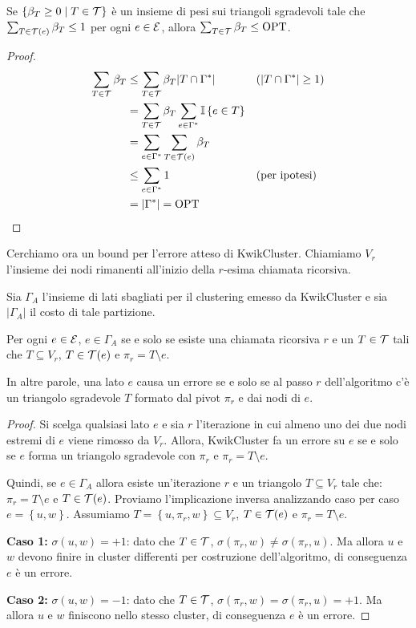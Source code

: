 \begin{lemma}
    \label{lemma:corr_clust_1}
    Se $\left\{\beta_T \geq 0 \mid T \in \mathcal{T} \right\}$ è un insieme di pesi sui triangoli sgradevoli tale che $\sum_{T \in \mathcal{T}(e)} \beta_T \leq 1$ per ogni $e \in \mathcal{E}$, allora $\sum_{T \in \mathcal{T}} \beta_T \leq \textnormal{OPT}$.
\end{lemma}
\begin{proof}
    \begin{align*}
    	\sum_{T \in \mathcal{T}} \beta_T & \leq \sum_{T \in \mathcal{T}} \beta_T |T \cap \Gamma^\ast| && (|T \cap \Gamma^\ast| \geq 1) \\
        & = \sum_{T \in \mathcal{T}} \beta_T \sum_{e \in \Gamma^\ast} \mathbb{I} \left\{e \in T \right\} \\
        & = \sum_{e \in \Gamma^\ast} \sum_{T \in \mathcal{T}(e)} \beta_T \\
    	& \leq \sum_{e \in \Gamma^\ast} 1 && (\text{per ipotesi}) \\
    	& = |\Gamma^\ast | = \textnormal{OPT}
    \end{align*}
\end{proof}

Cerchiamo ora un bound per l'errore atteso di KwikCluster. Chiamiamo $V_r$ l'insieme dei nodi rimanenti all'inizio della $r$-esima chiamata ricorsiva.

Sia $\Gamma_A$ l'insieme di lati sbagliati per il clustering emesso da KwikCluster e sia $|\Gamma_A|$ il costo di tale partizione. \\

\begin{lemma}
    \label{lemma:corr_cluster}
    Per ogni $e \in \mathcal{E}$, $e \in \Gamma_A$ se e solo se esiste una chiamata ricorsiva $r$ e un $T \in \mathcal{T}$ tali che $T \subseteq V_r$, $T \in \mathcal{T}(e)$ e $\pi_r = T \setminus e$.
\end{lemma}

In altre parole, una lato $e$ causa un errore se e solo se al passo $r$ dell'algoritmo c'è un triangolo sgradevole $T$ formato dal pivot $\pi_r$ e dai nodi di $e$.

\begin{proof}
    Si scelga qualsiasi lato $e$ e sia $r$ l'iterazione in cui almeno uno dei due nodi estremi di $e$ viene rimosso da $V_r$. Allora, KwikCluster fa un errore su $e$ se e solo se $e$ forma un triangolo sgradevole con $\pi_r$ e $\pi_r = T \setminus e$.

    Quindi, se $e \in \Gamma_A$ allora esiste un'iterazione $r$ e un triangolo $T \subseteq V_r$ tale che: $\pi_r = T \setminus e$ e $T \in \mathcal{T}(e)$. Proviamo l'implicazione inversa analizzando caso per caso $e = \left\{u, w\right\}$. Assumiamo $T = \left\{u, \pi_r, w\right\} \subseteq V_r$, $T \in \mathcal{T}(e)$ e $\pi_r = T \setminus e$.

    \textbf{Caso 1:} $\sigma(u,w) = +1$: dato che $T \in \mathcal{T}$, $\sigma(\pi_r, w) \neq \sigma (\pi_r, u)$. Ma allora $u$ e $w$ devono finire in cluster differenti per costruzione dell'algoritmo, di conseguenza $e$ è un errore.

    \textbf{Caso 2:} $\sigma(u,w) = -1$: dato che $T \in \mathcal{T}$, $\sigma(\pi_r, w) = \sigma (\pi_r, u) = +1$. Ma allora $u$ e $w$ finiscono nello stesso cluster, di conseguenza $e$ è un errore.
\end{proof}

